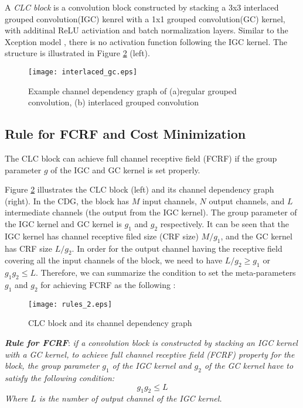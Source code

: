\documentclass[10pt,twocolumn,letterpaper]{article}
\begin{document}
A \textit{CLC block} is a convolution block constructed by stacking a 3x3 interlaced grouped convolution(IGC) kenrel with a 1x1 grouped convolution(GC) kernel, with additinal ReLU activiation and batch normalization layers. Similar to the Xception model \cite{xception2017chollet}, there is no activation function following the IGC kernel. The structure is illustrated in Figure \ref{fig:FCRF} (left).

\begin{figure}[b!]
\begin{center}
\texttt{[image: interlaced\_gc.eps]}
                   
\end{center}
   \caption{Example channel dependency graph of (a)regular grouped convolution, (b) interlaced grouped convolution}
\label{fig:igc}
\end{figure}

\subsection{Rule for FCRF and Cost Minimization}
The CLC block can achieve full channel receptive field (FCRF) if the group parameter $g$ of the  IGC and GC  kernel is set properly. 

Figure \ref{fig:FCRF} illustrates the CLC block (left) and its channel dependency graph (right). In the CDG, the block has $M$ input channels, $N$ output channels, and $L$ intermediate channels (the output from the IGC kernel). The group parameter of the IGC kernel and GC kernel is $g_1$ and $g_2$ respectively. It can be seen that the IGC kernel has channel receptive filed size (CRF size) $M/g_1$, and the GC kernel has CRF size $L/g_2$. In order for the output channel having the receptive field covering all the input channels of the block, we need to have $L/g_2\ge{g_1}$ or $g_1g_2\le{L}$. Therefore, we can summarize the condition to set the meta-parameters $g_1$ and $g_2$ for achieving FCRF as the following :

\begin{figure}[t!]
\begin{center}
\texttt{[image: rules\_2.eps]}
\end{center}
   \caption{CLC block and its channel dependency graph}
\label{fig:FCRF}
\end{figure}

\vspace{10pt}
\textbf{\textit{Rule for FCRF}}: \textit{if a convolution block is constructed by stacking an IGC kernel with a GC kernel, to achieve full channel receptive field (FCRF) property for the block, the group parameter $g_1$ of the IGC kernel and $g_2$ of the GC kernel have to satisfy the following condition:} 
\begin{equation}
g_1g_2 \le{L}
\label{eq:FCRF}
\end{equation}
\textit{Where $L$ is the number of output channel of the IGC kernel.}
\vspace{4pt}
\end{document}
